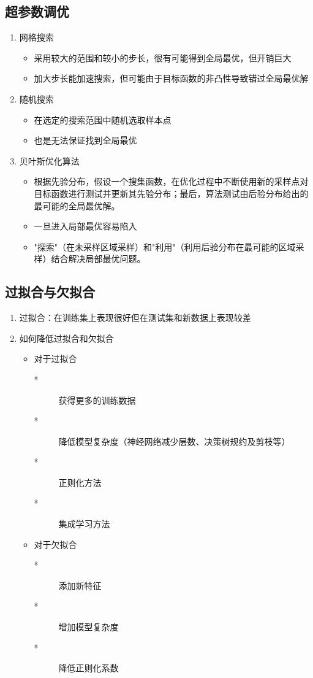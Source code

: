\documentclass[UTF8]{article}%
\begin{document}
		\subsection{超参数调优}
		\begin{enumerate}
			\item 网格搜索
			\begin{itemize}
				\item 采用较大的范围和较小的步长，很有可能得到全局最优，但开销巨大
				\item 加大步长能加速搜索，但可能由于目标函数的非凸性导致错过全局最优解
			\end{itemize}
			\item 随机搜索
			\begin{itemize}
				\item 在选定的搜索范围中随机选取样本点
				\item 也是无法保证找到全局最优
			\end{itemize}
			\item 贝叶斯优化算法
			\begin{itemize}
				\item 根据先验分布，假设一个搜集函数，在优化过程中不断使用新的采样点对目标函数进行测试并更新其先验分布；最后，算法测试由后验分布给出的最可能的全局最优解。
				\item 一旦进入局部最优容易陷入
				\item "探索"（在未采样区域采样）和"利用"（利用后验分布在最可能的区域采样）结合解决局部最优问题。
			\end{itemize}
		\end{enumerate}	
		
		\subsection{过拟合与欠拟合}
		\begin{enumerate}
			\item 过拟合：在训练集上表现很好但在测试集和新数据上表现较差
			\item 如何降低过拟合和欠拟合
			\begin{itemize}
				\item 对于过拟合
				\begin{description}
					\item[*] 获得更多的训练数据
					\item[*] 降低模型复杂度（神经网络减少层数、决策树规约及剪枝等）
					\item[*] 正则化方法
					\item[*] 集成学习方法
				\end{description}
				\item 对于欠拟合
				\begin{description}
					\item[*] 添加新特征
					\item[*] 增加模型复杂度
					\item[*] 降低正则化系数
				\end{description}
			\end{itemize}
		\end{enumerate}
\end{document}
